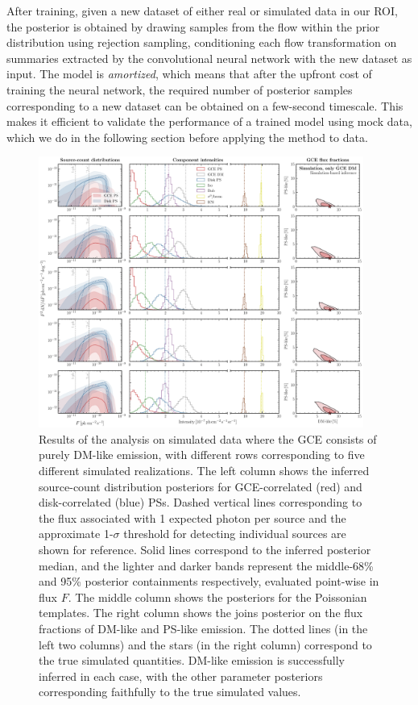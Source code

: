 \documentclass[prd,aps,10pt,nofootinbib,twocolumn,superscriptaddress,preprintnumbers,balancelastpage,longbibliography,floatfix]{revtex4-2}
\begin{document}
After training, given a new dataset of either real or simulated \Fermi data in our ROI, the posterior is obtained by drawing samples from the flow within the prior distribution using rejection sampling, conditioning each flow transformation on summaries extracted by the convolutional neural network with the new dataset as input. The model is \emph{amortized}, which means that after the upfront cost of training the neural network, the required number of posterior samples corresponding to a new dataset can be obtained on a few-second timescale. This makes it efficient to validate the performance of a trained model using mock data, which we do in the following section before applying the method to \Fermi data.

%
\begin{figure}[!htbp]
\centering
\includegraphics[width=0.95\textwidth]{plots/sim_sbi_dm.pdf}
\caption{Results of the analysis on simulated \Fermi data where the GCE consists of purely DM-like emission, with different rows corresponding to five different simulated realizations. The left column shows the inferred source-count distribution posteriors for GCE-correlated (red) and disk-correlated (blue) PSs. Dashed vertical lines corresponding to the flux associated with 1 expected photon per source and the approximate 1-$\sigma$ threshold for detecting individual sources are shown for reference. Solid lines correspond to the inferred posterior median, and the lighter and darker bands represent the middle-68\% and 95\% posterior containments respectively, evaluated point-wise in flux $F$. The middle column shows the posteriors for the Poissonian templates. The right column shows the joins posterior on the flux fractions of DM-like and PS-like emission. The dotted lines (in the left two columns) and the stars (in the right column) correspond to the true simulated quantities. DM-like emission is successfully inferred in each case, with the other parameter posteriors corresponding faithfully to the true simulated values.} 
\label{fig:sim_sbi_dm}
\end{figure}
%
\end{document}
